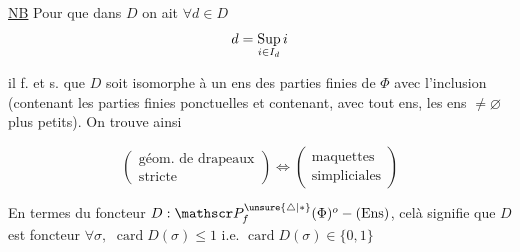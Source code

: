 
\uline{NB} Pour que dans $D$ on ait $\forall d\in D$
\[
 d=\mathop{\rm Sup}_{i\in I_d}i
\]


il f. et s. que $D$ soit isomorphe à un ens des parties finies \inserted{$\ne\varnothing$} de $\Phi$ avec l'inclusion (contenant les parties finies ponctuelles et contenant, avec tout ens, les ens $\ne\varnothing$ plus petits). On trouve ainsi

\[
 \left(\begin{array}{c}\text{géom. de drapeaux}\\\text{stricte}\end{array}\right)
 \Longleftrightarrow
 \left(\begin{array}{c}\text{maquettes}\\\text{simpliciales}\end{array}\right)
\]

En termes du foncteur $D:\mathscr P_f^{\unsure{\triangle|*}}(\Phi)^o\mathbin{-}(\mathrm{Ens})$, celà signifie que $D$ est   foncteur     $\forall\sigma,$ $\operatorname{card}D(\sigma)\leq1$ i.e. $\operatorname{card}D(\sigma)\in\{0,1\}$

